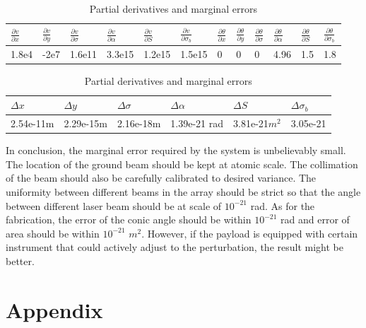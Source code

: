 \documentclass{article}
\begin{document}
		\begin{table}[!htb]
		\centering
		\label{pd}
		\caption{Partial derivatives and marginal errors}
		\begin{tabular}{llllllllllll}
			\toprule
			$\frac{\partial v}{\partial x}$ &$\frac{\partial v}{\partial y}$ &$\frac{\partial v}{\partial \sigma}$ &$\frac{\partial v}{\partial \alpha}$ &$\frac{\partial v}{\partial S}$ &$\frac{\partial v}{\partial \sigma_b}$& $\frac{\partial \theta}{\partial x}$ &$\frac{\partial \theta}{\partial y}$ &$\frac{\partial \theta}{\partial \sigma}$ &$\frac{\partial \theta}{\partial \alpha}$ &$\frac{\partial \theta}{\partial S}$ &$\frac{\partial \theta}{\partial \sigma_b}$	\\
			\midrule
			1.8e4 &	-2e7	& 1.6e11	& 3.3e15	&1.2e15	& 1.5e15 &0&0	&0 &4.96 &1.5	&1.8	\\
			\bottomrule
		\end{tabular}
		\begin{tabular}{llllll}
			\\
			\toprule
			$\Delta x$ & $\Delta y$ & $\Delta \sigma$ & $\Delta \alpha$ & $\Delta S$ & $\Delta \sigma_b$ \\
			\midrule
			2.54e-11m	&2.29e-15m	&2.16e-18m	&1.39e-21 rad	&3.81e-21$m^2$	&3.05e-21	\\
			\bottomrule
		\end{tabular}
	\end{table}
	
	In conclusion, the marginal error required by the system is unbelievably small. The location of the ground beam should be kept at atomic scale. The collimation of the beam should also be carefully calibrated to desired variance. The uniformity between different beams in the array should be strict so that the angle between different laser beam should be at scale of $10^{-21}$ rad. As for the fabrication, the error of the conic angle should be within $10^{-21}$ rad and error of area should be within $10^{-21}\,\,m^2$. However, if the payload is equipped with certain instrument that could actively adjust to the perturbation, the result might be better.
	


\section{Appendix}
\end{document}
